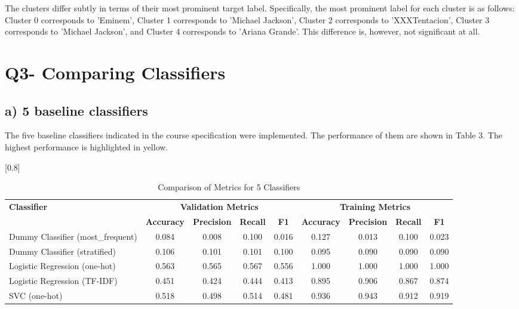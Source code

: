 \documentclass[a4paper,11pt]{article}
\begin{document}
The clusters differ subtly in terms of their most prominent target label. 
Specifically, the most prominent label for each cluster is as follows: Cluster 0 corresponds to 'Eminem', Cluster 1 corresponds to 'Michael Jackson', Cluster 2 corresponds to 'XXXTentacion', Cluster 3 corresponds to 'Michael Jackson', and Cluster 4 corresponds to 'Ariana Grande'.
This difference is, however, not significant at all.





\section{Q3- Comparing Classifiers}
\subsection{a) 5 baseline classifiers}
The five baseline classifiers indicated in the course specification were implemented.
The performance of them are shown in Table 3.
The highest performance is highlighted in yellow.

\begin{table}[htbp]
    \centering
    \caption{Comparison of Metrics for 5 Classifiers}
    \label{tab:classifier_metrics}
    \small
    \scalebox{0.8}[0.8]{
    \begin{tabular}{l|cccc|cccc}
        \hline
        \textbf{Classifier} & \multicolumn{4}{c|}{\textbf{Validation Metrics}} & \multicolumn{4}{c}{\textbf{Training Metrics}} \\
        & \textbf{Accuracy} & \textbf{Precision} & \textbf{Recall} & \textbf{F1} & \textbf{Accuracy} & \textbf{Precision} & \textbf{Recall} & \textbf{F1} \\
        \hline
        Dummy Classifier (most\_frequent) & {0.084} & 0.008 & 0.100 & 0.016 & 0.127 & 0.013 & 0.100 & 0.023 \\
        Dummy Classifier (stratified) & 0.106 & 0.101 & 0.101 & 0.100 & 0.095 & 0.090 & 0.090 & 0.090 \\
        \rowcolor[rgb]{0.9,0.9,0}Logistic Regression (one-hot) & \colorbox[rgb]{0.9, 0.9, 0}{0.563} & \colorbox[rgb]{0.9, 0.9, 0}{0.565} & \colorbox[rgb]{0.9, 0.9, 0}{0.567} & \colorbox[rgb]{0.9, 0.9, 0}{0.556} & 1.000 & 1.000 & 1.000 & 1.000 \\
        Logistic Regression (TF-IDF) & 0.451 & 0.424 & 0.444 & 0.413 & 0.895 & 0.906 & 0.867 & 0.874 \\
        SVC (one-hot) & 0.518 & 0.498 & 0.514 & 0.481 & 0.936 & 0.943 & 0.912 & 0.919 \\
        \hline
    \end{tabular}
    }
\end{table}
\end{document}
